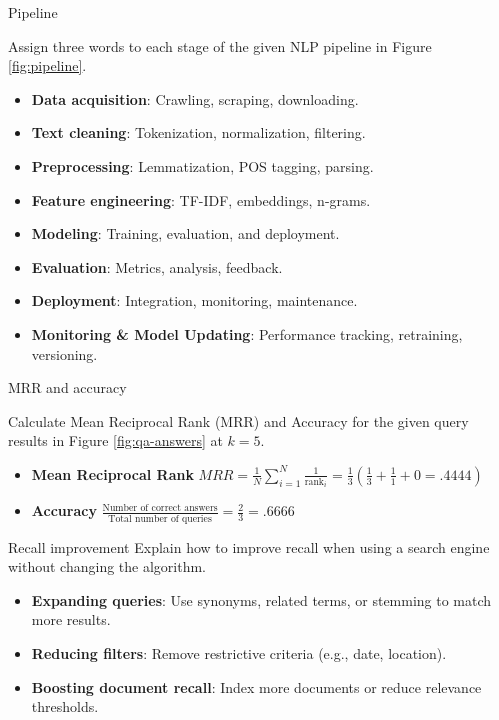 \documentclass{article}
\begin{document}
\begin{exercise}{Pipeline}
  
  Assign three words to each stage of the given NLP pipeline in Figure \ref{fig:pipeline}.

  \begin{solution}
    \begin{itemize}
      \item \textbf{Data acquisition}: Crawling, scraping, downloading.
      \item \textbf{Text cleaning}: Tokenization, normalization, filtering.
      \item \textbf{Preprocessing}: Lemmatization, POS tagging, parsing.
      \item \textbf{Feature engineering}: TF-IDF, embeddings, n-grams.
      \item \textbf{Modeling}: Training, evaluation, and deployment.
      \item \textbf{Evaluation}: Metrics, analysis, feedback.
      \item \textbf{Deployment}: Integration, monitoring, maintenance.
      \item \textbf{Monitoring \& Model Updating}: Performance tracking, retraining, versioning.
    \end{itemize}
  \end{solution}
\end{exercise}

\begin{exercise}{MRR and accuracy}
  
  Calculate Mean Reciprocal Rank (MRR) and Accuracy for the given query results in Figure \ref{fig:qa-answers} at $k=5$.

  \begin{solution}
    \begin{itemize}
        \item \textbf{Mean Reciprocal Rank} $MRR = \frac{1}{N} \sum_{i=1}^{N} \frac{1}{\text{rank}_i} = \frac{1}{3} (\frac{1}{3}+\frac{1}{1}+0 = .4444)$
        \item \textbf{Accuracy} $\frac{\text{Number of correct answers}}{\text{Total number of queries}} = \frac{2}{3} = .6666$
    \end{itemize}
  \end{solution}
\end{exercise}

\begin{exercise}{Recall improvement}
  Explain how to improve recall when using a search engine without changing the algorithm.

  \begin{solution}
    \begin{itemize}
        \item \textbf{Expanding queries}: Use synonyms, related terms, or stemming to match more results.
        \item \textbf{Reducing filters}: Remove restrictive criteria (e.g., date, location).
        \item \textbf{Boosting document recall}: Index more documents or reduce relevance thresholds.
    \end{itemize}
  \end{solution}
\end{exercise}
\end{document}
